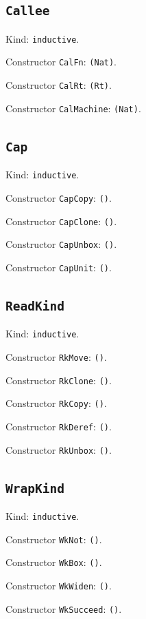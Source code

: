 \documentclass[11pt]{article}
\begin{document}
\subsection*{\texttt{Callee}}
\noindent Kind: \texttt{inductive}.\par
\noindent Constructor \texttt{CalFn}: \texttt{(Nat)}.\par
\noindent Constructor \texttt{CalRt}: \texttt{(Rt)}.\par
\noindent Constructor \texttt{CalMachine}: \texttt{(Nat)}.\par
\subsection*{\texttt{Cap}}
\noindent Kind: \texttt{inductive}.\par
\noindent Constructor \texttt{CapCopy}: \texttt{()}.\par
\noindent Constructor \texttt{CapClone}: \texttt{()}.\par
\noindent Constructor \texttt{CapUnbox}: \texttt{()}.\par
\noindent Constructor \texttt{CapUnit}: \texttt{()}.\par
\subsection*{\texttt{ReadKind}}
\noindent Kind: \texttt{inductive}.\par
\noindent Constructor \texttt{RkMove}: \texttt{()}.\par
\noindent Constructor \texttt{RkClone}: \texttt{()}.\par
\noindent Constructor \texttt{RkCopy}: \texttt{()}.\par
\noindent Constructor \texttt{RkDeref}: \texttt{()}.\par
\noindent Constructor \texttt{RkUnbox}: \texttt{()}.\par
\subsection*{\texttt{WrapKind}}
\noindent Kind: \texttt{inductive}.\par
\noindent Constructor \texttt{WkNot}: \texttt{()}.\par
\noindent Constructor \texttt{WkBox}: \texttt{()}.\par
\noindent Constructor \texttt{WkWiden}: \texttt{()}.\par
\noindent Constructor \texttt{WkSucceed}: \texttt{()}.\par
\end{document}
